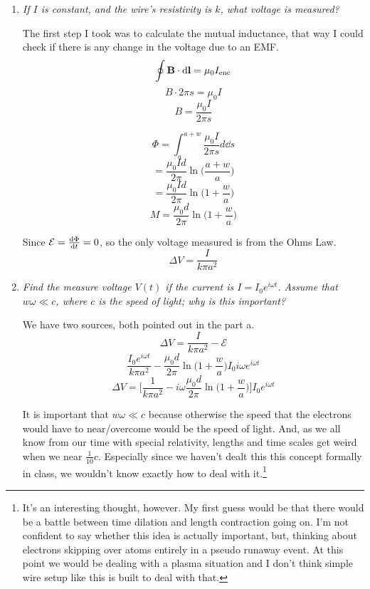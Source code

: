 \documentclass[12pt]{article}
\begin{document}
\begin{enumerate}[label=\alph*)]
\item \emph{If $I$ is constant, and the wire's resistivity is $k$, what voltage is measured?}\bigskip

The first step I took was to calculate the mutual inductance, that way I could check if there is any change in the voltage due to an EMF. 
\[\oint \vb{B}\cdot \dd{\vb{l}} = \mu_0 I_\text{enc}\]
\[B\cdot 2\pi s = \mu_0 I\]
\[B = \frac{\mu_0 I}{2 \pi s}\]\bigskip

\[\Phi = \int^{a+w}_a \frac{\mu_0 I}{2 \pi s} d \dd{s}\]
\[= \frac{\mu_0 I d}{2 \pi}\ln\Big(\frac{a+w}{a}\Big)\]
\[= \frac{\mu_0 I d}{2 \pi}\ln\Big(1+\frac{w}{a}\Big)\]\bigskip
\begin{equation}
M = \frac{\mu_0 d}{2 \pi}\ln\Big(1+\frac{w}{a}\Big)
\label{eq:3.1}
\end{equation}

Since $\mathcal{E} = \dv{\Phi}{t} = 0$, so the only voltage measured is from the Ohms Law.
\[\Delta V = \frac{I}{k \pi a^2}\]

\item \emph{Find the measure voltage $V(t)$ if the current is $I = I_0 e^{i\omega t}$. Assume that $w\omega \ll c$, where $c$ is the speed of light; why is this important?}\bigskip

We have two sources, both pointed out in the part a.
\[\Delta V = \frac{I}{k \pi a^2} - \mathcal{E}\]
\[\frac{I_0 e^{i\omega t}}{k \pi a^2}-\frac{\mu_0 d}{2 \pi} \ln\Big(1 + \frac{w}{a}\Big) I_0 i\omega e^{i \omega t} \]
\[\Delta V = \Big[\frac{1}{k \pi a^2}- i\omega \frac{\mu_0 d}{2 \pi} \ln\Big(1 + \frac{w}{a}\Big)\Big]I_0 e^{i \omega t} \]

It is important that $w\omega \ll c$ because otherwise the speed that the electrons would have to near/overcome would be the speed of light. And, as we all know from our time with special relativity, lengths and time scales get weird when we near $\frac{1}{10} c$. Especially since we haven't dealt this this concept formally in class, we wouldn't know exactly how to deal with it.\footnote{It's an interesting thought, however. My first guess would be that there would be a battle between time dilation and length contraction going on. I'm not confident to say whether this idea is actually important, but, thinking about electrons skipping over atoms entirely in a pseudo runaway event. At this point we would be dealing with a plasma situation and I don't think simple wire setup like this is built to deal with that.} 

\end{enumerate}
\newpage
\end{document}
